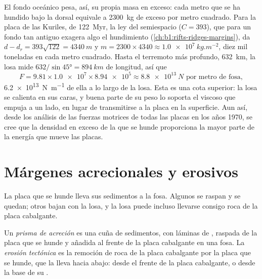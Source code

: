 El fondo oceánico pesa, así, su propia masa en exceso: cada metro que se ha hundido bajo la dorsal equivale a \qty{2300}{kg} de exceso por
metro cuadrado. Para la placa de las Kuriles, de \qty{122}{Myr}, la ley del semiespacio ($C = 393$), que para un fondo tan antiguo exagera algo
el hundimiento (\cref{ch:b1:rifts-ridges-margins}), da $d - d_r = 393\sqrt{122} = \qty{4340}{m}$ y $m = 2300\times4340 \approx \qty{1.0e7}{kg.m^{-2}}$,
diez mil toneladas en cada metro cuadrado. Hasta el terremoto más profundo, \qty{632}{km}, la losa mide
$632/\sin\ang{45} = \qty{894}{km}$ de longitud, así que
\[
  F = 9.81 \times \num{1.0e7} \times \num{8.94e5} \approx \qty{8.8e13}{N}
  \text{ por metro de fosa},
\]
\qty{6.2e13}{N.m^{-1}} de ella a lo largo de la losa. Esta es una cota superior: la losa se calienta en sus caras, y buena parte de su peso
lo soporta el  viscoso que empuja a un lado, en lugar de transmitirse a la placa en la superficie. Aun así, desde los análisis de las
fuerzas motrices de todas las placas en los años 1970, se cree que la densidad en exceso de la  que se hunde proporciona la mayor
parte de la energía que mueve las placas.

\section{Márgenes acrecionales y erosivos}\label{sec:b1:active-margins:prisms}

La placa que se hunde lleva sus sedimentos a la fosa. Algunos se raspan y se quedan; otros bajan con la losa, y la losa puede incluso llevarse
consigo roca de la placa cabalgante.

\begin{definition}\label{def:b1:active-margins:accretionary}
Un \emph{prisma de acreción} es una cuña de sedimentos, con láminas de , raspada de la placa que
se hunde y añadida al frente de la placa cabalgante en una fosa. La \emph{erosión tectónica} es la remoción de roca
de la placa cabalgante por la placa que se hunde, que la lleva hacia abajo: desde el frente de la placa cabalgante, o desde la base de su .
\end{definition}

